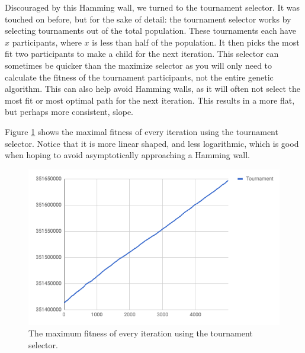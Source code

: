 Discouraged by this Hamming wall, we turned to the tournament selector. It was touched on before, but for the sake of detail: the tournament selector works by selecting tournaments out of the total population. These tournaments each have $x$ participants, where $x$ is less than half of the population. It then picks the most fit two participants to make a child for the next iteration. This selector can sometimes be quicker than the maximize selector as you will only need to calculate the fitness of the tournament participants, not the entire genetic algorithm. This can also help avoid Hamming walls, as it will often not select the most fit or most optimal path for the next iteration. This results in a more flat, but perhaps more consistent, slope. 

Figure \ref{fig:tournament} shows the maximal fitness of every iteration using the tournament selector. Notice that it is more linear shaped, and less logarithmic, which is good when hoping to avoid asymptotically approaching a Hamming wall.
\begin{figure}
    \centering
    \includegraphics[width=0.6\linewidth]{Tournament.png}
    \caption[Tournament selection maximum fitness graph]{The maximum fitness of every iteration using the tournament selector. }
    \label{fig:tournament}
\end{figure}

